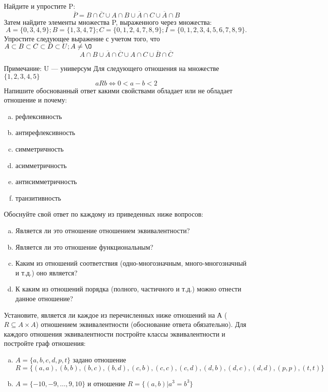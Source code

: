 \documentclass[10pt]{exam}
\begin{document}
\begin{questions}
\question
Найдите и упростите P:
\begin{equation*}
\overline{P} = B \cap \overline{C} \cup A \cap B \cup \overline{A} \cap C \cup \overline{A} \cap B
\end{equation*}
Затем найдите элементы множества P, выраженного через множества:
\begin{equation*}
A = \{0, 3, 4, 9\}; 
B = \{1, 3, 4, 7\};
C = \{0, 1, 2, 4, 7, 8, 9\};
I = \{0, 1, 2, 3, 4, 5, 6, 7, 8, 9\}.
\end{equation*}\question
Упростите следующее выражение с учетом того, что $A\subset B \subset C \subset D \subset U; A \neq \O$
\begin{equation*}
A \cap B \cup \overline{A} \cap \overline{C} \cup A \cap C \cup \overline{B} \cap \overline{C}
\end{equation*}

Примечание: U — универсум\question
Для следующего отношения на множестве $\{1, 2, 3, 4, 5\}$ 
\begin{equation*}
aRb \iff 0 < a-b<2
\end{equation*}
Напишите обоснованный ответ какими свойствами обладает или не обладает отношение и почему:   
\begin{enumerate} [a)]\setcounter{enumi}{0}
\item рефлексивность
\item антирефлексивность
\item симметричность
\item асимметричность
\item антисимметричность
\item транзитивность
\end{enumerate}

Обоснуйте свой ответ по каждому из приведенных ниже вопросов:
\begin{enumerate} [a)]\setcounter{enumi}{0}
    \item Является ли это отношение отношением эквивалентности?
    \item Является ли это отношение функциональным?
    \item Каким из отношений соответствия (одно-многозначным, много-многозначный и т.д.) оно является?
    \item К каким из отношений порядка (полного, частичного и т.д.) можно отнести данное отношение?
\end{enumerate}
\question
Установите, является ли каждое из перечисленных ниже отношений на А ($R \subseteq A \times A$) отношением эквивалентности (обоснование ответа обязательно). Для каждого отношения эквивалентности постройте классы 
эквивалентности и постройте граф отношения:
\begin{enumerate} [a)]\setcounter{enumi}{0}
\item $A = \{a, b, c, d, p, t\}$ задано отношение $R = \{(a, a), (b, b), (b, c), (b, d), (c, b), (c, c), (c, d), (d, b), (d, c), (d, d), (p,p), (t,t)\}$
\item $A = \{-10, -9, … , 9, 10\}$ и отношение $R = \{(a,b)|a^{3} = b^{3}\}$


\end{enumerate}
\end{questions}
\end{document}
